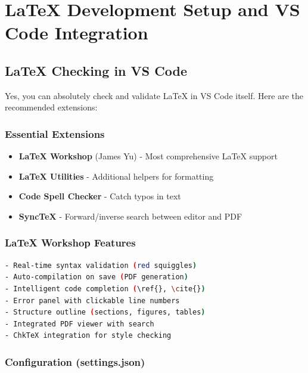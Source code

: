 \documentclass[10pt,twocolumn,a4paper]{article}
\begin{document}

\section{LaTeX Development Setup and VS Code Integration}

\subsection{LaTeX Checking in VS Code}

Yes, you can absolutely check and validate LaTeX in VS Code itself. Here are the recommended extensions:

\subsubsection{Essential Extensions}

\begin{itemize}
    \item \textbf{LaTeX Workshop} (James Yu) - Most comprehensive LaTeX support
    \item \textbf{LaTeX Utilities} - Additional helpers for formatting
    \item \textbf{Code Spell Checker} - Catch typos in text
    \item \textbf{SyncTeX} - Forward/inverse search between editor and PDF
\end{itemize}

\subsubsection{LaTeX Workshop Features}

\begin{lstlisting}[language=bash]
- Real-time syntax validation (red squiggles)
- Auto-compilation on save (PDF generation)
- Intelligent code completion (\ref{}, \cite{})
- Error panel with clickable line numbers
- Structure outline (sections, figures, tables)
- Integrated PDF viewer with search
- ChkTeX integration for style checking
\end{lstlisting}

\subsubsection{Configuration (settings.json)}
\end{document}
